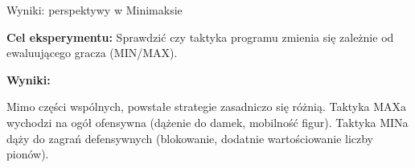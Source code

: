 \begin{frame}{Wyniki: perspektywy w Minimaksie}

    \textbf{Cel eksperymentu:} Sprawdzić czy taktyka programu zmienia się zależnie od ewaluującego gracza (MIN/MAX).

    \textbf{Wyniki:}
    \begin{itemize}
        \myitem Mimo części wspólnych, powstałe strategie zasadniczo się różnią.
        \myitem Taktyka MAXa wychodzi na ogół ofensywna (dążenie do damek, mobilność figur).
        \myitem Taktyka MINa dąży do zagrań defensywnych (blokowanie, dodatnie wartościowanie liczby pionów).
    \end{itemize}

\end{frame}

